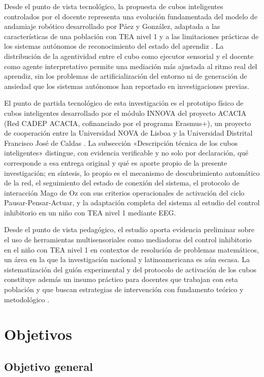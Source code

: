 \documentclass{book}
\begin{document}
Desde el punto de vista tecnológico, la 
propuesta de cubos inteligentes controlados 
por el docente representa una evolución 
fundamentada del modelo de andamiaje 
robótico desarrollado por Páez y González, 
adaptada a las características de una 
población con TEA nivel 1 y a las limitaciones 
prácticas de los sistemas autónomos de 
reconocimiento del estado del aprendiz 
\cite{PaezGonzalez2022}. La distribución 
de la agentividad entre el cubo como
ejecutor sensorial y el docente como agente
interpretativo permite una mediación más
ajustada al ritmo real del aprendiz, sin
los problemas de artificialización del
entorno ni de generación de ansiedad
que los sistemas autónomos han reportado
en investigaciones previas.

El punto de partida tecnológico de esta investigación es el
prototipo físico de cubos inteligentes desarrollado por el
módulo INNOVA del proyecto ACACIA (Red CADEP ACACIA,
cofinanciado por el programa Erasmus+), un proyecto de
cooperación entre la Universidad NOVA de Lisboa y la
Universidad Distrital Francisco José de Caldas
\citep{ACACIA2025}. La subsección «Descripción técnica de los
cubos inteligentes» distingue, con evidencia verificable y no
solo por declaración, qué corresponde a esa entrega original y
qué es aporte propio de la presente investigación; en síntesis,
lo propio es el mecanismo de descubrimiento automático de la
red, el seguimiento del estado de conexión del sistema, el
protocolo de interacción Mago de Oz con sus criterios
operacionales de activación del ciclo Pausar-Pensar-Actuar, y
la adaptación completa del sistema al estudio del control
inhibitorio en un niño con TEA nivel 1 mediante EEG.

Desde el punto de vista pedagógico, el
estudio aporta evidencia preliminar sobre 
el uso de herramientas multisensoriales 
como mediadoras del control inhibitorio
en el niño con TEA nivel 1 en
contextos de resolución de problemas
matemáticos, un área en la que la
investigación nacional y latinoamericana 
es aún escasa. La sistematización del 
guión experimental y del protocolo de 
activación de los cubos constituye 
además un insumo práctico para docentes 
que trabajan con esta población y que 
buscan estrategias de intervención 
con fundamento teórico y metodológico 
\cite{Diamond2013, APA2022}.

\section{Objetivos}

\subsection*{Objetivo general}
\end{document}
